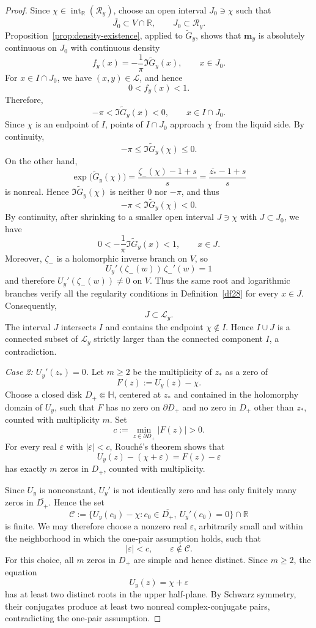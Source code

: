 \documentclass[10pt,a4paper]{amsart}
\begin{document}
\begin{proof}
Since \(\chi\in\operatorname{int}_{\mathbb R}(\mathcal R_y)\), choose an
open interval \(J_0\ni\chi\) such that
\[
    \overline{J_0}\subset V\cap\mathbb R,
    \qquad
    J_0\subset\mathcal R_y.
\]
Proposition~\ref{prop:density-existence}, applied to
\(\widetilde G_y\), shows that \(\mathbf m_y\) is absolutely continuous on
\(J_0\) with continuous density
\[
    f_y(x)
    =
    -\frac{1}{\pi}\Im\widetilde G_y(x),
    \qquad x\in J_0.
\]
For \(x\in I\cap J_0\), we have \((x,y)\in\mathcal L\), and hence
\[
    0<f_y(x)<1.
\]
Therefore,
\[
    -\pi<\Im\widetilde G_y(x)<0,
    \qquad x\in I\cap J_0.
\]
Since \(\chi\) is an endpoint of \(I\), points of \(I\cap J_0\) approach
\(\chi\) from the liquid side. By continuity,
\[
    -\pi\leq\Im\widetilde G_y(\chi)\leq0.
\]
On the other hand,
\[
    \exp\bigl(\widetilde G_y(\chi)\bigr)
    =
    \frac{\zeta_-(\chi)-1+s}{s}
    =
    \frac{\overline{z_*}-1+s}{s}
\]
is nonreal. Hence \(\Im\widetilde G_y(\chi)\) is neither \(0\) nor
\(-\pi\), and thus
\[
    -\pi<\Im\widetilde G_y(\chi)<0.
\]
By continuity, after shrinking to a smaller open interval
\(J\ni\chi\) with \(J\subset J_0\), we have
\[
    0<-\frac{1}{\pi}\Im\widetilde G_y(x)<1,
    \qquad x\in J.
\]
Moreover, \(\zeta_-\) is a holomorphic inverse branch on \(V\), so
\[
    U_y'(\zeta_-(w))\,\zeta_-'(w)=1
\]
and therefore \(U_y'(\zeta_-(w))\neq0\) on \(V\). Thus the same root and
logarithmic branches verify all the regularity conditions in
Definition~\ref{df28} for every \(x\in J\). Consequently,
\[
    J\subset\mathcal L_y.
\]
The interval \(J\) intersects \(I\) and contains the endpoint
\(\chi\notin I\). Hence \(I\cup J\) is a connected subset of
\(\mathcal L_y\) strictly larger than the connected component \(I\), a
contradiction.

\medskip
\noindent\emph{Case 2: \(U_y'(z_*)=0\).}
Let \(m\geq2\) be the multiplicity of \(z_*\) as a zero of
\[
    F(z):=U_y(z)-\chi.
\]
Choose a closed disk \(D_+\Subset\mathbb H\), centered at \(z_*\) and
contained in the holomorphy domain of \(U_y\), such that \(F\) has no zero
on \(\partial D_+\) and no zero in \(D_+\) other than \(z_*\), counted with
multiplicity \(m\). Set
\[
    c:=\min_{z\in\partial D_+}|F(z)|>0.
\]
For every real \(\varepsilon\) with \(|\varepsilon|<c\), Rouch\'e's theorem
shows that
\[
    U_y(z)-(\chi+\varepsilon)=F(z)-\varepsilon
\]
has exactly \(m\) zeros in \(D_+\), counted with multiplicity.

Since \(U_y\) is nonconstant, \(U_y'\) is not identically zero and has only
finitely many zeros in \(\overline{D_+}\). Hence the set
\[
    \mathcal C
    :=
    \bigl\{
        U_y(c_0)-\chi:
        c_0\in\overline{D_+},\ U_y'(c_0)=0
    \bigr\}
    \cap\mathbb R
\]
is finite. We may therefore choose a nonzero real \(\varepsilon\),
arbitrarily small and within the neighborhood in which the one-pair
assumption holds, such that
\[
    |\varepsilon|<c,
    \qquad
    \varepsilon\notin\mathcal C.
\]
For this choice, all \(m\) zeros in \(D_+\) are simple and hence distinct.
Since \(m\geq2\), the equation
\[
    U_y(z)=\chi+\varepsilon
\]
has at least two distinct roots in the upper half-plane. By Schwarz
symmetry, their conjugates produce at least two nonreal complex-conjugate
pairs, contradicting the one-pair assumption.


\end{proof}
\end{document}
